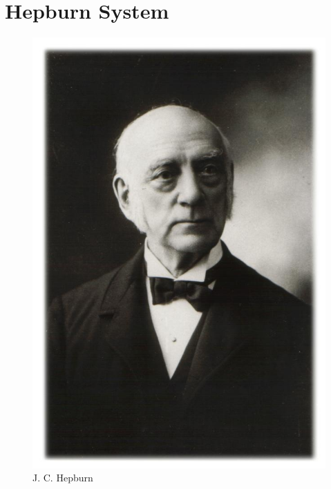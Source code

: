 \newpage
\section{Hepburn System}
\label{sec:Hepburn}
\label{sec:HepburnSystem}
\label{sec:OlderHepburnSystem}
\label{sec:NewerHepburnSystem}

\newcommand{\lhepburnsystem}{\ivoc{Hepburn system}{ヘボン式}{へぼんしき}{Hepburn System}}
\newcommand{\loldhepburnsystem}{\ivoc{old Hepburn system}{標準ヘボン式ローマ字}{ひょうじゅん・へぼん・ろまあじ}{altes Hepburn System}}
\newcommand{\lnewhepburnsystem}{\ivoc{new Hepburn system}{修正ヘボン式ローマ字}{しゅうせい・へぼんしき・ろうまじ}{neues Hepburn System}}

\begin{figure}
        \includegraphics[scale=0.5,trim= 00 00 00 00]{../share/ei/James_Curtis_Hepburn.jpg}%
        \caption{J. C. Hepburn}
        \label{fig:JamesCurtisHepburn}
\end{figure}

